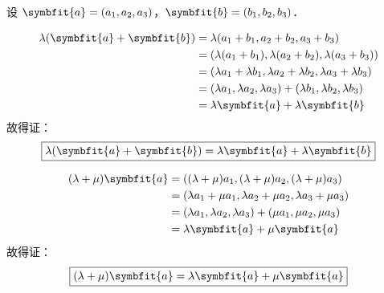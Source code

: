 \begin{myproof}
    设 $\symbfit{a} = (a_1, a_2, a_3)$，$\symbfit{b} = (b_1, b_2, b_3)$．


    \begin{equation}
        \begin{aligned}
            \lambda(\symbfit{a} + \symbfit{b}) & = \lambda(a_1 + b_1, a_2 + b_2, a_3 + b_3)                                          \\
                                               & = (\lambda(a_1 + b_1), \lambda(a_2 + b_2), \lambda(a_3 + b_3))                      \\
                                               & = (\lambda a_1 + \lambda b_1, \lambda a_2 + \lambda b_2, \lambda a_3 + \lambda b_3) \\
                                               & = (\lambda a_1, \lambda a_2, \lambda a_3) + (\lambda b_1, \lambda b_2, \lambda b_3) \\
                                               & = \lambda\symbfit{a} + \lambda\symbfit{b}
        \end{aligned}
    \end{equation}
    故得证：
    \begin{equation}
        \boxed{\lambda(\symbfit{a} + \symbfit{b}) = \lambda\symbfit{a} + \lambda\symbfit{b}}
    \end{equation}


    \begin{equation}
        \begin{aligned}
            (\lambda + \mu)\symbfit{a} & = ((\lambda + \mu)a_1, (\lambda + \mu)a_2, (\lambda + \mu)a_3)          \\
                                       & = (\lambda a_1 + \mu a_1, \lambda a_2 + \mu a_2, \lambda a_3 + \mu a_3) \\
                                       & = (\lambda a_1, \lambda a_2, \lambda a_3) + (\mu a_1, \mu a_2, \mu a_3) \\
                                       & = \lambda\symbfit{a} + \mu\symbfit{a}
        \end{aligned}
    \end{equation}
    故得证：
    \begin{equation}
        \boxed{(\lambda + \mu)\symbfit{a} = \lambda\symbfit{a} + \mu\symbfit{a}}
    \end{equation}


\end{myproof}
